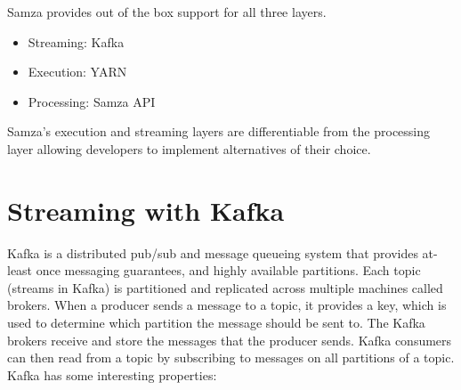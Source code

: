 \documentclass[9pt,twocolumn,twoside]{styles/osajnl}
\begin{document}
Samza provides out of the box support for all three layers.

\begin{itemize}
\renewcommand{\labelitemi}{\scriptsize$\square$} 
\item Streaming: Kafka
\item Execution: YARN
\item Processing: Samza API
\end{itemize}




Samza’s execution and streaming layers are differentiable from the processing
layer allowing developers to implement alternatives of their choice.

\section{Streaming with Kafka}
Kafka is a distributed pub/sub and message queueing system that provides
at-least once messaging guarantees, and highly available partitions. Each topic
(streams in Kafka) is partitioned and replicated across multiple machines called
brokers. When a producer sends a message to a topic, it provides a key, which is
used to determine which partition the message should be sent to. The Kafka
brokers receive and store the messages that the producer sends. Kafka consumers
can then read from a topic by subscribing to messages on all partitions of a
topic.\cite{paper2}
Kafka has some interesting properties:
\end{document}
